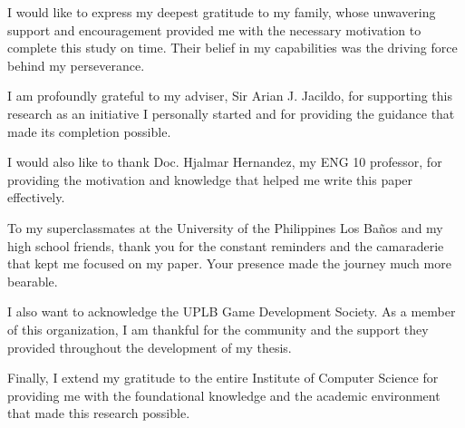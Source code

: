 \documentclass{icsthesis}
\begin{document}
\begin{frontmatter}
\begin{biosketch}
			\addauthorsignaturefield
		\end{biosketch}	
		
		\begin{acknowledgement}
I would like to express my deepest gratitude to my family, whose unwavering support and encouragement provided me with the necessary motivation to complete this study on time. Their belief in my capabilities was the driving force behind my perseverance.

I am profoundly grateful to my adviser, Sir Arian J. Jacildo, for supporting this research as an initiative I personally started and for providing the guidance that made its completion possible.

I would also like to thank Doc. Hjalmar Hernandez, my ENG 10 professor, for providing the motivation and knowledge that helped me write this paper effectively.

To my superclassmates at the University of the Philippines Los Baños and my high school friends, thank you for the constant reminders and the camaraderie that kept me focused on my paper. Your presence made the journey much more bearable.

I also want to acknowledge the UPLB Game Development Society. As a member of this organization, I am thankful for the community and the support they provided throughout the development of my thesis.

Finally, I extend my gratitude to the entire Institute of Computer Science for providing me with the foundational knowledge and the academic environment that made this research possible.
		\end{acknowledgement}
		
		\maketableofcontents
		
		\makelistoftables

		\makelistoffigures
	
		

\end{frontmatter}
\end{document}
